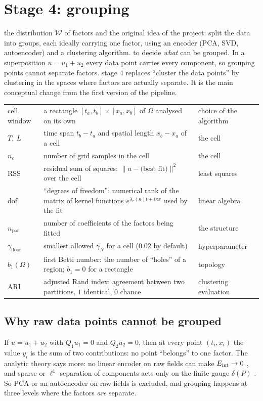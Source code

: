 \section{Stage 4: grouping}\label{sec:group}
\sectionbrief
{the distribution $\mathcal W$ of factors and the original idea of the project: split the data into groups, each ideally carrying one factor, using an encoder (PCA, SVD, autoencoder) and a clustering algorithm.}
{to decide \emph{what} can be grouped. In a superposition $u=u_1+u_2$ every data point carries every component, so grouping points cannot separate factors.}
{stage 4 replaces ``cluster the data points'' by clustering in the spaces where factors are actually separate. It is the main conceptual change from the first version of the pipeline.}

\begin{symbols}
\begin{tabular}{@{}L{2.6cm}L{6.0cm}L{4.3cm}@{}}
cell, window & a rectangle $[t_a,t_b]\times[x_a,x_b]$ of $\Omega$ analysed on its own & choice of the algorithm\\
$T,\ L$ & time span $t_b-t_a$ and spatial length $x_b-x_a$ of a cell & the cell\\
$n_c$ & number of grid samples in the cell & the cell\\
RSS & residual sum of squares: $\|u-\text{(best fit)}\|^2$ over the cell & least squares\\
dof & ``degrees of freedom'': numerical rank of the matrix of kernel functions $e^{\lambda_r(\kappa)t+i\kappa x}$ used by the fit & linear algebra\\
$n_{\mathrm{par}}$ & number of coefficients of the factors being fitted & the structure\\
$\gamma_{\mathrm{floor}}$ & smallest allowed $\gamma_N$ for a cell ($0.02$ by default) & hyperparameter\\
$b_1(\Omega)$ & first Betti number: the number of ``holes'' of a region; $b_1=0$ for a rectangle & topology\\
ARI & adjusted Rand index: agreement between two partitions, $1$ identical, $0$ chance & clustering evaluation\\
\end{tabular}
\end{symbols}

\subsection{Why raw data points cannot be grouped}
If $u=u_1+u_2$ with $Q_1u_1=0$ and $Q_2u_2=0$, then at every point $(t_i,x_i)$ the value $y_i$ is the sum of two contributions: no point ``belongs'' to one factor. The analytic theory says more: no linear encoder on raw fields can make $E_{\mathrm{int}}\to0$ , and sparse or $\ell^1$ separation of components acts only on the finite gauge $\delta(P)$ . So PCA or an autoencoder on raw fields is excluded, and grouping happens at three levels where the factors \emph{are} separate.

